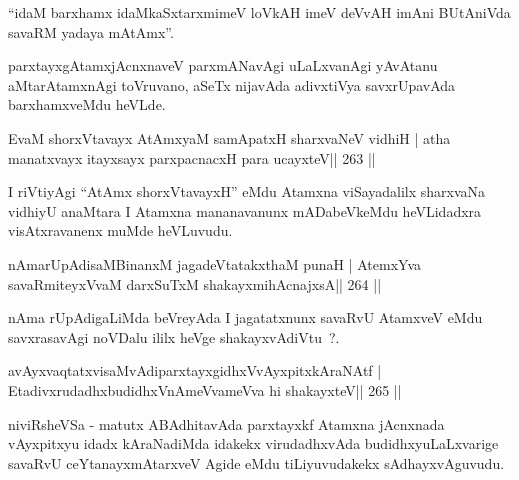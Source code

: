 \begin{artha}
``idaM barxhamx idaMkaSxtarxmimeV loVkAH imeV deVvAH imAni BUtAniVda savaRM yadaya mAtAmx''.
\end{artha}

\begin{artha}
parxtayxgAtamxjAcnxnaveV parxmANavAgi uLaLxvanAgi yAvAtanu aMtarAtamxnAgi toVruvano, aSeTx nijavAda adivxtiVya savxrUpavAda barxhamxveMdu heVLde.
\end{artha}




\begin{shl}
EvaM shorxVtavayx AtAmx\s yaM samApatxH sharxvaNeV vidhiH |
atha manatxvayx itayxsayx parxpacnacxH para ucayxteV\hfill || 263 ||
\end{shl}

\begin{artha}
I riVtiyAgi ``AtAmx shorxVtavayxH'' eMdu Atamxna viSayadalilx sharxvaNa vidhiyU anaMtara I Atamxna mananavanunx mADabeVkeMdu heVLidadxra visAtxravanenx muMde heVLuvudu.
\end{artha}


\begin{shl}
nAmarUpAdisaMBinanxM jagadeVtatakxthaM punaH |
AtemxYva savaRmiteyxVvaM darxSuTxM shakayxmihAcnajxsA\hfill || 264 ||
\end{shl}

\begin{artha}
nAma rUpAdigaLiMda beVreyAda I jagatatxnunx savaRvU AtamxveV eMdu savxrasavAgi noVDalu ililx heVge shakayxvAdiVtu~?.
\end{artha}


\begin{shl}
avAyxvaqtatxvisaMvAdiparxtayxgidhxVvAyxpitxkAraNAtf |
EtadivxrudadhxbudidhxVnAmeVvameVva hi shakayxteV\hfill || 265 ||
\end{shl}

\begin{artha}
niviRsheVSa - matutx ABAdhitavAda parxtayxkf Atamxna jAcnxnada vAyxpitxyu idadx kAraNadiMda idakekx virudadhxvAda budidhxyuLaLxvarige savaRvU ceYtanayxmAtarxveV Agide eMdu tiLiyuvudakekx sAdhayxvAguvudu.
\end{artha}

